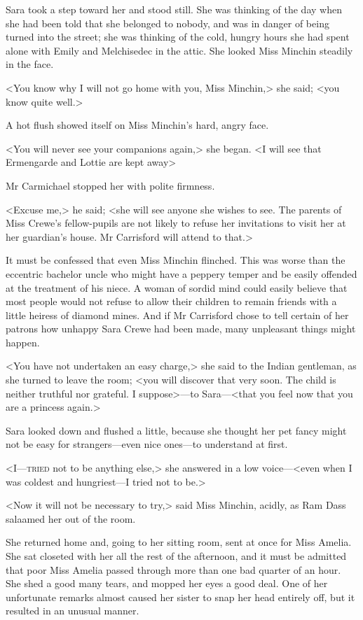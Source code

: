 Sara took a step toward her and stood still. She was thinking of the day when she had been told that she belonged to nobody, and was in danger of being turned into the street; she was thinking of the cold, hungry hours she had spent alone with Emily and Melchisedec in the attic. She looked Miss Minchin steadily in the face.

<You know why I will not go home with you, Miss Minchin,> she said; <you know quite well.>

A hot flush showed itself on Miss Minchin's hard, angry face.

<You will never see your companions again,> she began. <I will see that Ermengarde and Lottie are kept away\longdash>

Mr Carmichael stopped her with polite firmness.

<Excuse me,> he said; <she will see anyone she wishes to see. The parents of Miss Crewe's fellow-pupils are not likely to refuse her invitations to visit her at her guardian's house. Mr Carrisford will attend to that.>

It must be confessed that even Miss Minchin flinched. This was worse than the eccentric bachelor uncle who might have a peppery temper and be easily offended at the treatment of his niece. A woman of sordid mind could easily believe that most people would not refuse to allow their children to remain friends with a little heiress of diamond mines. And if Mr Carrisford chose to tell certain of her patrons how unhappy Sara Crewe had been made, many unpleasant things might happen.

<You have not undertaken an easy charge,> she said to the Indian gentleman, as she turned to leave the room; <you will discover that very soon. The child is neither truthful nor grateful. I suppose>—to Sara—<that you feel now that you are a princess again.>

Sara looked down and flushed a little, because she thought her pet fancy might not be easy for strangers—even nice ones—to understand at first.

<I—\textsc{tried} not to be anything else,> she answered in a low voice—<even when I was coldest and hungriest—I tried not to be.>

<Now it will not be necessary to try,> said Miss Minchin, acidly, as Ram Dass salaamed her out of the room.


She returned home and, going to her sitting room, sent at once for Miss Amelia. She sat closeted with her all the rest of the afternoon, and it must be admitted that poor Miss Amelia passed through more than one bad quarter of an hour. She shed a good many tears, and mopped her eyes a good deal. One of her unfortunate remarks almost caused her sister to snap her head entirely off, but it resulted in an unusual manner.

